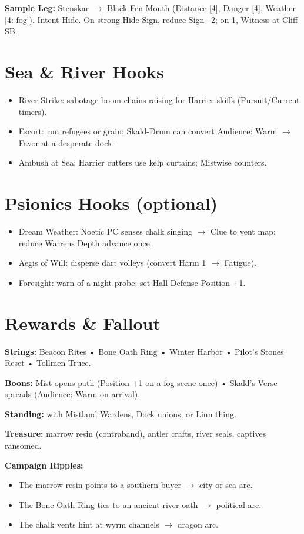 \documentclass[11pt]{article}
\begin{document}
\textbf{Sample Leg:} Stenskar $\rightarrow$ Black Fen Mouth (Distance [4], Danger [4], Weather [4: fog]). Intent Hide. On strong Hide Sign, reduce Sign --2; on 1, Witness at Cliff SB.

\section{Sea \& River Hooks}
\begin{itemize}
\item River Strike: sabotage boom-chains raising for Harrier skiffs (Pursuit/Current timers).
\item Escort: run refugees or grain; Skald-Drum can convert Audience: Warm $\rightarrow$ Favor at a desperate dock.
\item Ambush at Sea: Harrier cutters use kelp curtains; Mistwise counters.
\end{itemize}

\section{Psionics Hooks (optional)}
\begin{itemize}
\item Dream Weather: Noetic PC senses chalk singing $\rightarrow$ Clue to vent map; reduce Warrens Depth advance once.
\item Aegis of Will: disperse dart volleys (convert Harm 1 $\rightarrow$ Fatigue).
\item Foresight: warn of a night probe; set Hall Defense Position +1.
\end{itemize}

\section{Rewards \& Fallout}

\textbf{Strings:} Beacon Rites • Bone Oath Ring • Winter Harbor • Pilot's Stones Reset • Tollmen Truce.

\textbf{Boons:} Mist opens path (Position +1 on a fog scene once) • Skald's Verse spreads (Audience: Warm on arrival).

\textbf{Standing:} with Mistland Wardens, Dock unions, or Linn thing.

\textbf{Treasure:} marrow resin (contraband), antler crafts, river seals, captives ransomed.

\textbf{Campaign Ripples:}
\begin{itemize}
\item The marrow resin points to a southern buyer $\rightarrow$ city or sea arc.
\item The Bone Oath Ring ties to an ancient river oath $\rightarrow$ political arc.
\item The chalk vents hint at wyrm channels $\rightarrow$ dragon arc.
\end{itemize}
\end{document}
